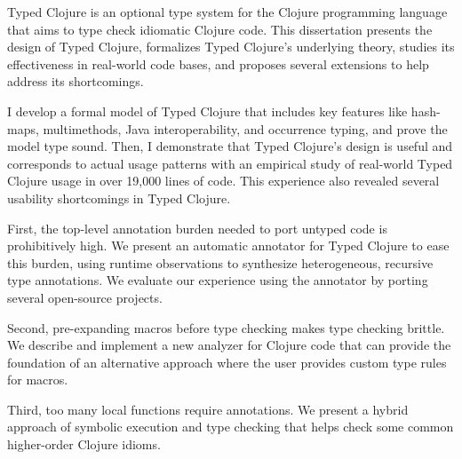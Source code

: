 
Typed Clojure is an optional type system for the Clojure programming language that aims to type check idiomatic Clojure code.
This dissertation presents the design of Typed Clojure, formalizes Typed Clojure's underlying theory, studies its effectiveness
in real-world code bases, and proposes several extensions to help address its shortcomings.

I develop a formal model of Typed Clojure that includes
key features like hash-maps, multimethods, Java interoperability, and occurrence typing,
and prove the model type sound.
Then, I demonstrate that Typed Clojure's design is useful and corresponds to actual usage patterns
with an empirical study of real-world Typed Clojure usage in over 19,000 lines of code.
This experience also revealed several usability shortcomings in Typed Clojure.

First, the top-level annotation burden needed to port untyped code is prohibitively high.
We present an automatic annotator for Typed Clojure to ease this burden, using runtime
observations to synthesize heterogeneous, recursive type annotations. We evaluate our
experience using the annotator by porting several open-source projects.

Second, pre-expanding macros before type checking makes type checking brittle.
We describe and implement a new analyzer for Clojure code that can provide the
foundation of an alternative approach where the user provides custom type rules for macros.

Third, too many local functions require annotations. We present a hybrid approach of symbolic 
execution and type checking that helps check some common higher-order Clojure idioms.

